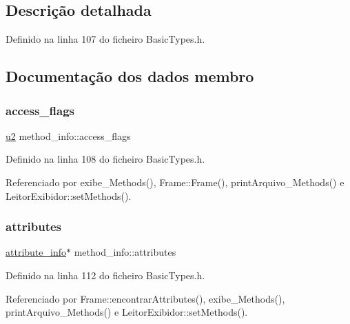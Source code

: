 \subsection{Descrição detalhada}


Definido na linha 107 do ficheiro Basic\+Types.\+h.



\subsection{Documentação dos dados membro}
\mbox{\label{structmethod__info_a3b657027a141cdbc94ded28607c98be5}} 
\subsubsection{\texorpdfstring{access\+\_\+flags}{access\_flags}}
{\footnotesize\ttfamily \hyperlink{BasicTypes_8h_a732cde1300aafb73b0ea6c2558a7a54f}{u2} method\+\_\+info\+::access\+\_\+flags}



Definido na linha 108 do ficheiro Basic\+Types.\+h.



Referenciado por exibe\+\_\+\+Methods(), Frame\+::\+Frame(), print\+Arquivo\+\_\+\+Methods() e Leitor\+Exibidor\+::set\+Methods().

\mbox{\label{structmethod__info_a8ce4caaa03680c91f548558a38647ad8}} 
\subsubsection{\texorpdfstring{attributes}{attributes}}
{\footnotesize\ttfamily \hyperlink{structattribute__info}{attribute\+\_\+info}$\ast$ method\+\_\+info\+::attributes}



Definido na linha 112 do ficheiro Basic\+Types.\+h.



Referenciado por Frame\+::encontrar\+Attributes(), exibe\+\_\+\+Methods(), print\+Arquivo\+\_\+\+Methods() e Leitor\+Exibidor\+::set\+Methods().


